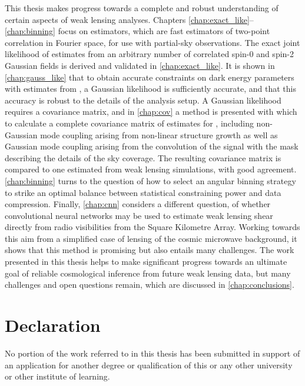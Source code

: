 This thesis makes progress towards a complete and robust understanding of certain aspects of weak lensing analyses. Chapters \ref{chap:exact_like}--\ref{chap:binning} focus on \pcl{} estimators, which are fast estimators of two-point correlation in Fourier space, for use with partial-sky observations. The exact joint likelihood of \pcl{} estimates from an arbitrary number of correlated spin-0 and spin-2 Gaussian fields is derived and validated in \autoref{chap:exact_like}. It is shown in \autoref{chap:gauss_like} that to obtain accurate constraints on dark energy parameters with \pcl{} estimates from \Euclid{}, a Gaussian likelihood is sufficiently accurate, and that this accuracy is robust to the details of the analysis setup. A Gaussian likelihood requires a covariance matrix, and in \autoref{chap:cov} a method is presented with which to calculate a complete covariance matrix of \pcl{} estimates for \Euclid{}, including non-Gaussian mode coupling arising from non-linear structure growth as well as Gaussian mode coupling arising from the convolution of the signal with the mask describing the details of the sky coverage. The resulting covariance matrix is compared to one estimated from weak lensing simulations, with good agreement. \autoref{chap:binning} turns to the question of how to select an angular binning strategy to strike an optimal balance between statistical constraining power and data compression. Finally, \autoref{chap:cnn} considers a different question, of whether convolutional neural networks may be used to estimate weak lensing shear directly from radio visibilities from the Square Kilometre Array. Working towards this aim from a simplified case of lensing of the cosmic microwave background, it shows that this method is promising but also entails many challenges. The work presented in this thesis helps to make significant progress towards an ultimate goal of reliable cosmological inference from future weak lensing data, but many challenges and open questions remain, which are discussed in \autoref{chap:conclusions}.

\cleardoublepage
\vspace*{\fill}
\vspace{-10em}
\section*{Declaration}
No portion of the work referred to in this thesis has been submitted in support of an application for another degree or qualification of this or any other university or other institute of learning.
\vspace*{\fill}

